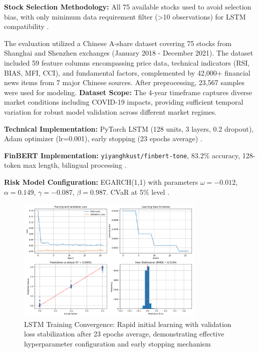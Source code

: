 \documentclass[3p,times,procedia]{elsarticle}
\begin{document}
\textbf{Stock Selection Methodology:} All 75 available stocks used to avoid selection bias, with only minimum data requirement filter (>10 observations) for LSTM compatibility \cite{FinReportDataset2025}.

The evaluation utilized a Chinese A-share dataset covering 75 stocks from Shanghai and Shenzhen exchanges (January 2018 - December 2021). The dataset included 59 feature columns encompassing price data, technical indicators (RSI, BIAS, MFI, CCI), and fundamental factors, complemented by 42,000+ financial news items from 7 major Chinese sources. After preprocessing, 23,567 samples were used for modeling. \textbf{Dataset Scope:} The 4-year timeframe captures diverse market conditions including COVID-19 impacts, providing sufficient temporal variation for robust model validation across different market regimes.

\textbf{Technical Implementation:} PyTorch LSTM (128 units, 3 layers, 0.2 dropout), Adam optimizer (lr=0.001), early stopping (23 epochs average) \cite{Kingma2015}.

\textbf{FinBERT Implementation:} \texttt{yiyanghkust/finbert-tone}, 83.2\% accuracy, 128-token max length, bilingual processing \cite{Araci2019}.

\textbf{Risk Model Configuration:} EGARCH(1,1) with parameters $\omega=-0.012$, $\alpha=0.149$, $\gamma=-0.087$, $\beta=0.987$. CVaR at 5\% level \cite{Nelson1991}.

\begin{figure}[!ht]
    \centering
    \includegraphics[width=0.80\textwidth]{Picture2.png}
    \caption{LSTM Training Convergence: Rapid initial learning with validation loss stabilization after 23 epochs average, demonstrating effective hyperparameter configuration and early stopping mechanism}
    \label{fig:learning_curve}
\end{figure}
\end{document}
